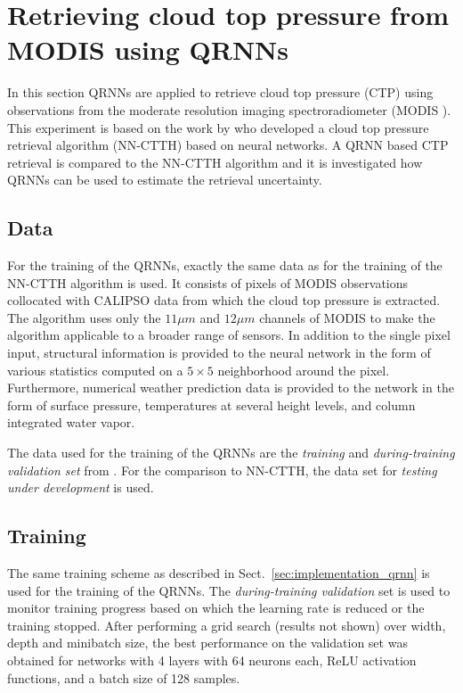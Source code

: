 \documentclass[journal abbreviation, manuscript]{copernicus}
\begin{document}
\section{Retrieving cloud top pressure from MODIS using QRNNs}
\label{sec:ctp}

In this section QRNNs are applied to retrieve cloud top pressure (CTP) using
observations from the moderate resolution imaging spectroradiometer (MODIS 
\citep{modis}). This experiment is based on the work by \cite{hakansson} who
developed a cloud top pressure retrieval algorithm (NN-CTTH) based on neural
networks. A QRNN based CTP retrieval is compared to the NN-CTTH algorithm and it
is investigated how QRNNs can be used to estimate the retrieval uncertainty.

\subsection{Data}

For the training of the QRNNs, exactly the same data as for the training of the
NN-CTTH algorithm is used. It consists of pixels of MODIS observations
collocated with CALIPSO \citep{calipso} data from which the cloud top pressure
is extracted. The algorithm uses only the $11 \unit{\mu m}$ and $12\unit{\mu m}$
channels of MODIS to make the algorithm applicable to a broader range of
sensors. In addition to the single pixel input, structural information is
provided to the neural network in the form of various statistics computed on a
$5 \times 5$ neighborhood around the pixel. Furthermore, numerical weather
prediction data is provided to the network in the form of surface pressure,
temperatures at several height levels, and column integrated water
vapor.

The data used for the training of the QRNNs are the \textit{training} and
\textit{during-training validation set} from \cite{hakansson}. For the
comparison to NN-CTTH, the data set for \textit{testing under development} is
used.

\subsection{Training}

The same training scheme as described in Sect.~\ref{sec:implementation_qrnn}
is used for the training of the QRNNs. The \textit{during-training validation} set is used
to monitor training progress based on which the learning rate is reduced or the
training stopped. After performing a grid search (results not shown) over width,
depth and minibatch size, the best performance on the validation set was
obtained for networks with 4 layers with 64 neurons each, ReLU activation functions,
 and a batch size of 128 samples.
\end{document}
